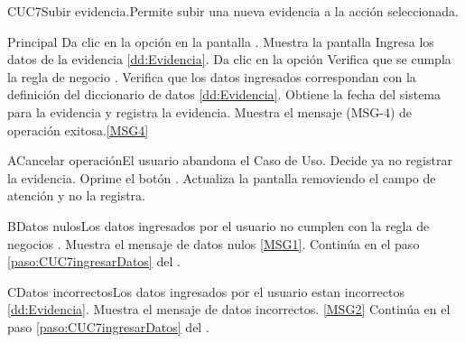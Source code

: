 
	\begin{UseCase}{CUC7}{Subir evidencia.}{Permite subir una nueva evidencia a la acción seleccionada.}
	\end{UseCase}
		
	\begin{UCtrayectoria}{Principal}
		\UCpaso[\UCactor] Da clic en la opción  en la pantalla .
		\UCpaso Muestra la pantalla 
		\UCpaso [\UCactor] Ingresa los datos de la evidencia \ref{dd:Evidencia}\label{paso:CUC7ingresarDatos}.
		\UCpaso [\UCactor] Da clic en la opción 
		\UCpaso Verifica que se cumpla la regla de negocio . 
		\UCpaso Verifica que los datos ingresados correspondan  con la definición del diccionario de datos \ref{dd:Evidencia}. 
		\UCpaso Obtiene la fecha del sistema para la evidencia y registra la evidencia.
		\UCpaso Muestra el mensaje (MSG-4) de operación exitosa.\ref{MSG4}
		\
	\end{UCtrayectoria}
		
	\begin{UCtrayectoriaA}{A}{Cancelar operación}{El usuario abandona el Caso de Uso.}
			\UCpaso[\UCactor] Decide ya no registrar la evidencia.
			\UCpaso[\UCactor] Oprime el botón .
			\UCpaso Actualiza la pantalla removiendo el campo de atención y no la registra.
	\end{UCtrayectoriaA}

	\begin{UCtrayectoriaA}{B}{Datos nulos}{Los datos ingresados por el usuario  no cumplen con la regla de negocios .}
			\UCpaso Muestra el mensaje de datos nulos \ref{MSG1}.
			\UCpaso Continúa en el paso \ref{paso:CUC7ingresarDatos} del .
	\end{UCtrayectoriaA}
	\begin{UCtrayectoriaA}{C}{Datos incorrectos}{Los datos ingresados por el usuario  estan incorrectos \ref{dd:Evidencia}.}
			\UCpaso Muestra el mensaje de datos incorrectos. \ref{MSG2}
			\UCpaso Continúa en el paso \ref{paso:CUC7ingresarDatos} del .
	\end{UCtrayectoriaA}
